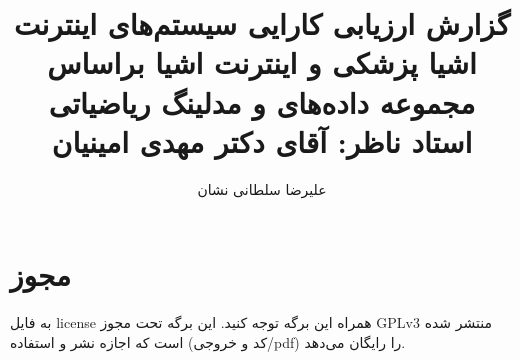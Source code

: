 \documentclass[a4paper]{article}
\title{گزارش ارزیابی کارایی سیستم‌های اینترنت اشیا پزشکی و اینترنت اشیا براساس
مجموعه داده‌های \lr{CICIoMT2024} و مدلینگ ریاضیاتی \\ استاد ناظر: آقای دکتر مهدی
امینیان}
\author{علیرضا سلطانی نشان}
\begin{document}
\maketitle
\tableofcontents

\section*{مجوز}

به فایل license همراه این برگه توجه کنید. این برگه تحت مجوز GPLv3 منتشر شده است
که اجازه نشر و استفاده (کد و خروجی/pdf) را رایگان می‌دهد.


\newpage


\end{document}
